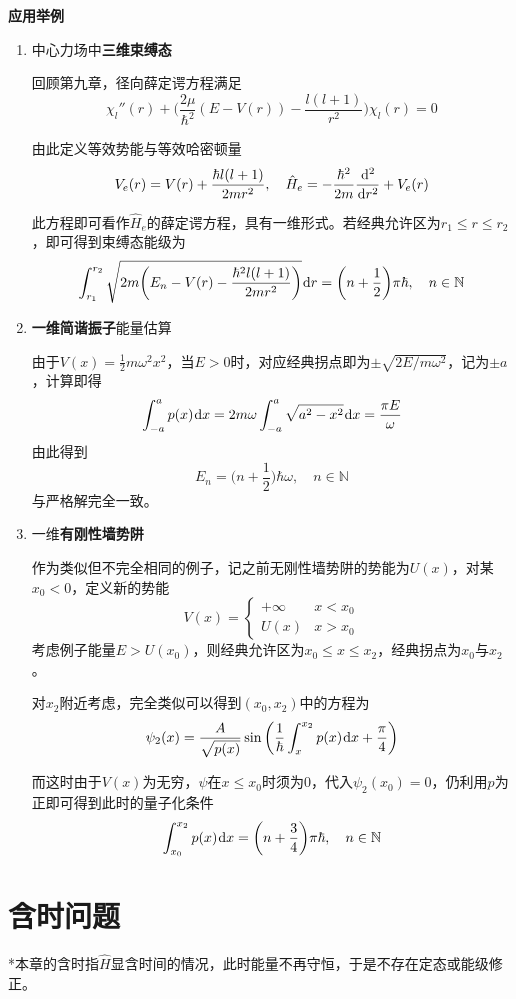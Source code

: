 \documentclass[a4paper,UTF8,fontset=windows]{ctexart}
\newcommand*{\dr}{\hspace{0.07em}\mathrm{d}}
\begin{document}
\textbf{应用举例}
\begin{enumerate}
    \item 中心力场中\textbf{三维束缚态}
    
    回顾第九章，径向薛定谔方程满足
    $$\chi_l''(r)+\bigg(\frac{2\mu}{\hbar^2}(E-V(r))-\frac{l(l+1)}{r^2}\bigg)\chi_l(r)=0$$

    由此定义等效势能与等效哈密顿量
    $$V_e(r)=V(r)+\frac{\hbar l(l+1)}{2m r^2},\quad\hat{H}_e=-\frac{\hbar^2}{2m}\frac{\dr^2}{\dr r^2}+V_e(r)$$

    此方程即可看作$\hat{H}_e$的薛定谔方程，具有一维形式。若经典允许区为$r_1\le r\le r_2$，即可得到束缚态能级为
    $$\int_{r_1}^{r_2}\sqrt{2m\bigg(E_n-V(r)-\frac{\hbar^2l(l+1)}{2mr^2}\bigg)}\dr r=\bigg(n+\frac{1}{2}\bigg)\pi\hbar,\quad n\in\mathbb{N}$$

    \item \textbf{一维简谐振子}能量估算
    
    由于$V(x)=\frac{1}{2}m\omega^2x^2$，当$E>0$时，对应经典拐点即为$\pm\sqrt{2E/m\omega^2}$，记为$\pm a$，计算即得
    $$\int_{-a}^ap(x)\dr x=2m\omega\int_{-a}^a\sqrt{a^2-x^2}\dr x=\frac{\pi E}{\omega}$$
    由此得到
    $$E_n=\bigg(n+\frac{1}{2}\bigg)\hbar\omega,\quad n\in\mathbb{N}$$
    与严格解完全一致。

    \item 一维\textbf{有刚性墙势阱}
    
    作为类似但不完全相同的例子，记之前无刚性墙势阱的势能为$U(x)$，对某$x_0<0$，定义新的势能
    $$V(x)=\begin{cases}+\infty&x<x_0\\U(x)&x>x_0\end{cases}$$
    考虑例子能量$E>U(x_0)$，则经典允许区为$x_0\le x\le x_2$，经典拐点为$x_0$与$x_2$。

    对$x_2$附近考虑，完全类似可以得到$(x_0,x_2)$中的方程为
    $$\psi_2(x)=\frac{A}{\sqrt{p(x)}}\sin\bigg(\frac{1}{\hbar}\int_x^{x_2}p(x)\dr x+\frac{\pi}{4}\bigg)$$

    而这时由于$V(x)$为无穷，$\psi$在$x\le x_0$时须为0，代入$\psi_2(x_0)=0$，仍利用$p$为正即可得到此时的量子化条件
    $$\int_{x_0}^{x_2}p(x)\dr x=\bigg(n+\frac{3}{4}\bigg)\pi\hbar,\quad n\in\mathbb{N}$$


\end{enumerate}

\section{含时问题}
*本章的含时指$\hat{H}$显含时间的情况，此时能量不再守恒，于是不存在定态或能级修正。
\end{document}
